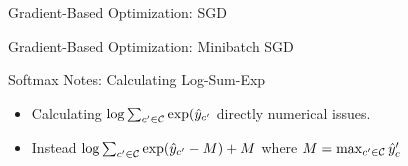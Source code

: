 \documentclass{beamer}
\begin{document}
\begin{frame}{Gradient-Based Optimization: SGD}
  \begin{figure}
    \begin{algorithmic}
      \EndWhile{}
      \State{\Return{$\theta$}}
      \EndProcedure{}
    \end{algorithmic}
  \end{figure}

\end{frame}


\begin{frame}{Gradient-Based Optimization: Minibatch SGD}
  \begin{figure}
    \begin{algorithmic}
      \EndFor{}
      \EndWhile{}
      \State{\Return{$\theta$}}
    \end{algorithmic}
  \end{figure}

\end{frame}


\begin{frame}{Softmax Notes: Calculating Log-Sum-Exp}
  \begin{itemize}
  \item Calculating $\log \sum_{c' \in \mathcal{C}} \exp(\hat{y}_{c'}$ directly numerical issues.
  \item Instead $\log \sum_{c' \in \mathcal{C}} \exp(\hat{y}_{c'} - M) + M$ where $M = \max_{c'\in\mathcal{C}} \hat{y}_c'$ 
  \end{itemize}
\end{frame}
\end{document}
